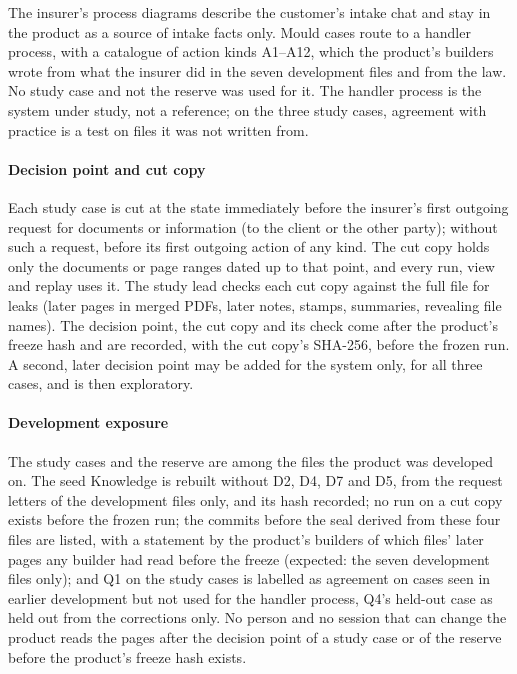 The insurer's process diagrams describe the customer's intake chat and stay in the product as a source of intake facts only. Mould cases route to a handler process, with a catalogue of action kinds A1--A12, which the product's builders wrote from what the insurer did in the seven development files and from the law. No study case and not the reserve was used for it. The handler process is the system under study, not a reference; on the three study cases, agreement with practice is a test on files it was not written from.

\paragraph{Decision point and cut copy}
Each study case is cut at the state immediately before the insurer's first outgoing request for documents or information (to the client or the other party); without such a request, before its first outgoing action of any kind. The cut copy holds only the documents or page ranges dated up to that point, and every run, view and replay uses it. The study lead checks each cut copy against the full file for leaks (later pages in merged PDFs, later notes, stamps, summaries, revealing file names). The decision point, the cut copy and its check come after the product's freeze hash and are recorded, with the cut copy's SHA-256, before the frozen run. A second, later decision point may be added for the system only, for all three cases, and is then exploratory.

\paragraph{Development exposure}
The study cases and the reserve are among the files the product was developed on. The seed Knowledge is rebuilt without D2, D4, D7 and D5, from the request letters of the development files only, and its hash recorded; no run on a cut copy exists before the frozen run; the commits before the seal derived from these four files are listed, with a statement by the product's builders of which files' later pages any builder had read before the freeze (expected: the seven development files only); and Q1 on the study cases is labelled as agreement on cases seen in earlier development but not used for the handler process, Q4's held-out case as held out from the corrections only. No person and no session that can change the product reads the pages after the decision point of a study case or of the reserve before the product's freeze hash exists.

